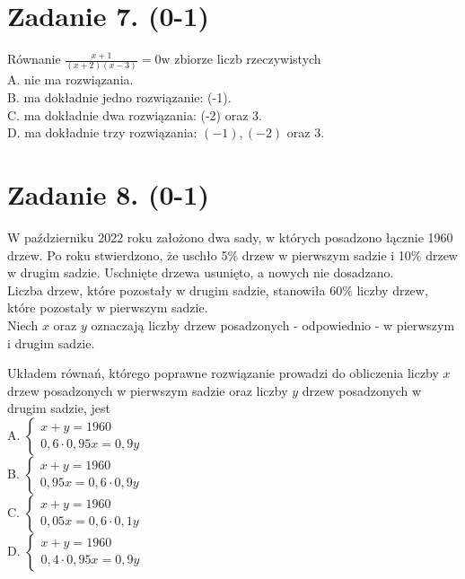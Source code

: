 \documentclass[10pt]{article}
\begin{document}
\section*{Zadanie 7. (0-1)}
Równanie \(\frac{x+1}{(x+2)(x-3)}=0 \mathrm{w}\) zbiorze liczb rzeczywistych\\
A. nie ma rozwiązania.\\
B. ma dokładnie jedno rozwiązanie: (-1).\\
C. ma dokładnie dwa rozwiązania: (-2) oraz 3.\\
D. ma dokładnie trzy rozwiązania: \((-1),(-2)\) oraz 3.

\section*{Zadanie 8. (0-1)}
W październiku 2022 roku założono dwa sady, w których posadzono łącznie 1960 drzew. Po roku stwierdzono, że uschło 5\% drzew w pierwszym sadzie i 10\% drzew w drugim sadzie. Uschnięte drzewa usunięto, a nowych nie dosadzano.\\
Liczba drzew, które pozostały w drugim sadzie, stanowiła \(60 \%\) liczby drzew, które pozostały w pierwszym sadzie.\\
Niech \(x\) oraz \(y\) oznaczają liczby drzew posadzonych - odpowiednio - w pierwszym i drugim sadzie.

Układem równań, którego poprawne rozwiązanie prowadzi do obliczenia liczby \(x\) drzew posadzonych w pierwszym sadzie oraz liczby \(y\) drzew posadzonych w drugim sadzie, jest\\
A. \(\left\{\begin{array}{l}x+y=1960 \\ 0,6 \cdot 0,95 x=0,9 y\end{array}\right.\)\\
B. \(\left\{\begin{array}{l}x+y=1960 \\ 0,95 x=0,6 \cdot 0,9 y\end{array}\right.\)\\
C. \(\left\{\begin{array}{l}x+y=1960 \\ 0,05 x=0,6 \cdot 0,1 y\end{array}\right.\)\\
D. \(\left\{\begin{array}{l}x+y=1960 \\ 0,4 \cdot 0,95 x=0,9 y\end{array}\right.\)
\end{document}
